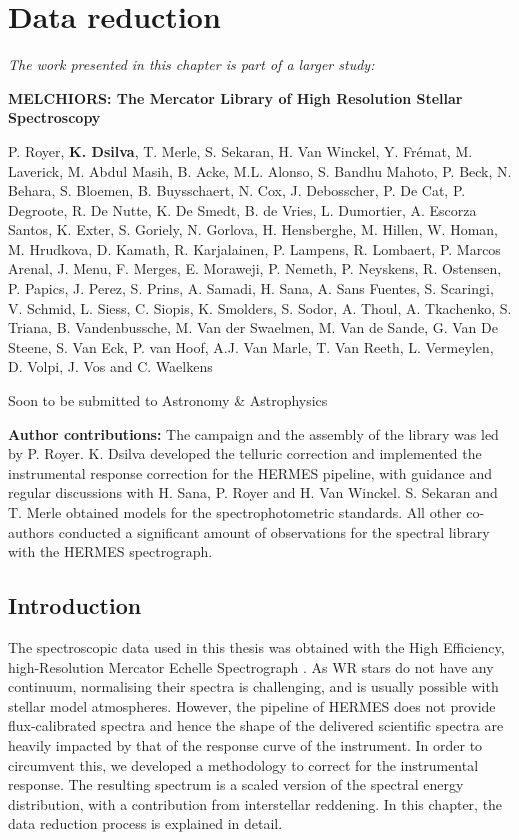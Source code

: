 \chapter{Data reduction} \label{ch:data_reduction}

\textit{The work presented in this chapter is part of a larger study:}

\textbf{MELCHIORS: The Mercator Library of High Resolution Stellar Spectroscopy}

P. Royer, \textbf{K. Dsilva}, T. Merle, S. Sekaran, H. Van Winckel, Y. Fr\'emat, M. Laverick, M. Abdul Masih, B. Acke, M.L. Alonso, S. Bandhu Mahoto, P. Beck, N. Behara, S. Bloemen, B. Buysschaert, N. Cox, J. Debosscher, P. De Cat, P. Degroote, R. De Nutte, K. De Smedt, B. de Vries, L. Dumortier, A. Escorza Santos, K. Exter, S. Goriely, N. Gorlova, H. Hensberghe, M. Hillen, W. Homan, M. Hrudkova, D. Kamath, R. Karjalainen, P. Lampens, R. Lombaert, P. Marcos Arenal, J. Menu, F. Merges, E. Moraweji, P. Nemeth, P. Neyskens, R. Ostensen, P. Papics, J. Perez, S. Prins, A. Samadi, H. Sana, A. Sans Fuentes, S. Scaringi, V. Schmid, L. Siess, C. Siopis, K. Smolders, S. Sodor, A. Thoul, A. Tkachenko, S. Triana, B. Vandenbussche, M. Van der Swaelmen, M. Van de Sande, G. Van De Steene, S. Van Eck, P. van Hoof, A.J. Van Marle, T. Van Reeth, L. Vermeylen, D. Volpi, J. Vos and C. Waelkens

Soon to be submitted to Astronomy \& Astrophysics

\textbf{Author contributions:} The campaign and the assembly of the library was led by P. Royer. K. Dsilva developed the telluric correction and implemented the instrumental response correction for the HERMES pipeline, with guidance and regular discussions with H. Sana, P. Royer and H. Van Winckel. S. Sekaran and T. Merle obtained models for the spectrophotometric standards. All other co-authors conducted a significant amount of observations for the spectral library with the HERMES spectrograph.

\section{Introduction}

The spectroscopic data used in this thesis was obtained with the High Efficiency, high-Resolution Mercator Echelle Spectrograph \citep[HERMES,][]{raskin_hermes_2011}. As WR stars do not have any continuum, normalising their spectra is challenging, and is usually possible with stellar model atmospheres. However, the pipeline of HERMES does not provide flux-calibrated spectra and hence the shape of the delivered scientific spectra are heavily impacted by that of the response curve of the instrument. In order to circumvent this, we developed a methodology to correct for the instrumental response. The resulting spectrum is a scaled version of the spectral energy distribution, with a contribution from interstellar reddening. In this chapter, the data reduction process is explained in detail.

